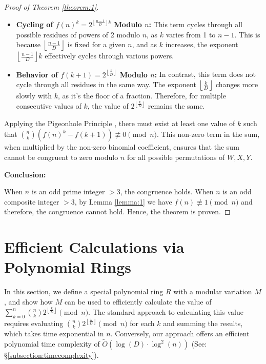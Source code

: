 \documentclass{article}
\theoremstyle{plain}
\theoremstyle{definition}
\begin{document}
\begin{proof}[Proof of Theorem \ref{theorem:1}]
\begin{itemize}
    \item \textbf{Cycling of \( f(n)^k = 2^{\left\lfloor \frac{n-1}{D} \right\rfloor k} \) Modulo \( n \):} This term cycles through all possible residues of powers of 2 modulo \( n \), as \( k \) varies from 1 to \( n-1 \). This is because \( \left\lfloor \frac{n-1}{D} \right\rfloor \) is fixed for a given \( n \), and as \( k \) increases, the exponent \( \left\lfloor \frac{n-1}{D} \right\rfloor k \) effectively cycles through various powers.
    \item \textbf{Behavior of \( f(k+1) = 2^{\left\lfloor \frac{k}{D} \right\rfloor} \) Modulo \( n \):} In contrast, this term does not cycle through all residues in the same way. The exponent \( \left\lfloor \frac{k}{D} \right\rfloor \) changes more slowly with \( k \), as it's the floor of a fraction. Therefore, for multiple consecutive values of \( k \), the value of \( 2^{\left\lfloor \frac{k}{D} \right\rfloor} \) remains the same.
\end{itemize}    

Applying the Pigeonhole Principle \cite{rosen2012}, there must exist at least one value of \( k \) such that \( \binom{n}{k} \left(f(n)^k - f(k+1)\right) \not\equiv 0 \pmod{n} \). This non-zero term in the sum, when multiplied by the non-zero binomial coefficient, ensures that the sum cannot be congruent to zero modulo \( n \) for all possible permutations of $W, X, Y$.

\textbf{Conclusion:}

When $n$ is an odd prime integer $>3$, the congruence holds. When $n$ is an odd composite integer $>3$, by Lemma \ref{lemma:1} we have $f(n) \not\equiv 1 \pmod{n}$ and therefore, the congruence cannot hold. Hence, the theorem is proven.
\end{proof}

\section{Efficient Calculations via Polynomial Rings} \label{section:polyrings}
In this section, we define a special polynomial ring $R$ with a modular variation $M$, and show how $M$ can be used to efficiently calculate the value of $\sum_{k=0}^{n} \binom{n}{k} 2^{\left\lfloor \frac{k}{D} \right\rfloor} \pmod{n}$. The standard approach to calculating this value requires evaluating $\binom{n}{k} 2^{\left\lfloor \frac{k}{D} \right\rfloor} \pmod{n}$ for each $k$ and summing the results, which takes time exponential in $n$. Conversely, our approach offers an efficient polynomial time complexity of $\tilde{O}(\log(D) \cdot \log^2(n))$ (See: \S \ref{subsection:timecomplexity}).
\end{document}
